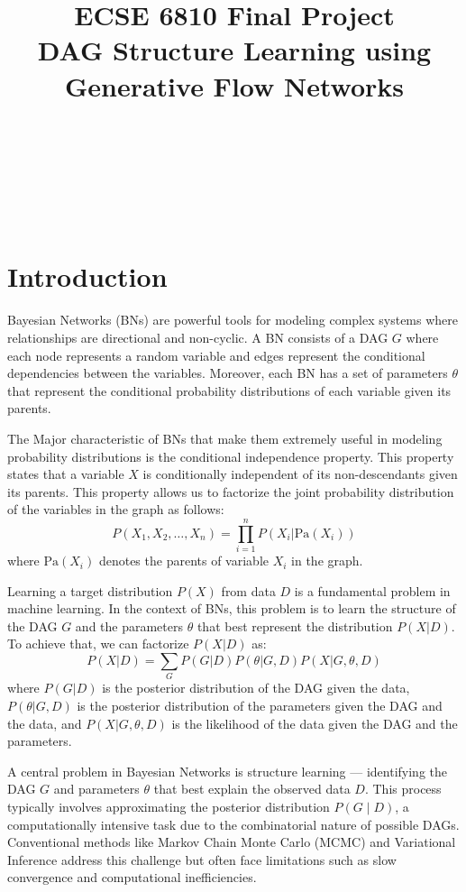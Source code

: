 \documentclass{lxaiproposal}
\title{ECSE 6810 Final Project \\ DAG Structure Learning using Generative Flow Networks}
\author{\coord{Ali}{Najibi}{}\\\\
\coord{\textbf{Course Instructor: Prof. Qiang}}{\textbf{Ji}}{}
}
\begin{document}
    \maketitle
    \\


    \section{Introduction}
    \vspace*{-3mm}

    Bayesian Networks (BNs) are powerful tools for modeling complex systems where relationships are directional and
    non-cyclic. A BN consists of a DAG $G$ where each node represents a random variable and edges
    represent the conditional dependencies between the variables. Moreover, each BN has a set of parameters $\theta$ that
    represent the conditional probability distributions of each variable given its parents.

    The Major characteristic of BNs that make them extremely useful in modeling probability distributions is the
    conditional independence property. This property states that a variable $X$ is conditionally independent of its
    non-descendants given its parents. This property allows us to factorize the joint probability distribution of the
    variables in the graph as follows:
    \begin{equation}
        P(X_1, X_2, \ldots, X_n) = \prod_{i=1}^{n} P(X_i | \text{Pa}(X_i))
        \label{eq:bn_factorization}
    \end{equation}
    where $\text{Pa}(X_i)$ denotes the parents of variable $X_i$ in the graph.

    Learning a target distribution $P(X)$ from data $D$ is a fundamental problem in machine learning. In the context of
    BNs, this problem is to learn the structure of the DAG $G$ and the parameters $\theta$ that best represent the
    distribution $P(X|D)$. To achieve that, we can factorize $P(X|D)$ as:
    \begin{equation}
        P(X|D) = \sum_{G} P(G|D) P(\theta|G,D) P(X|G,\theta,D)
        \label{eq:bn_learning}
    \end{equation}
    where $P(G|D)$ is the posterior distribution of the DAG given the data, $P(\theta|G,D)$ is the posterior distribution
    of the parameters given the DAG and the data, and $P(X|G,\theta,D)$ is the likelihood of the data given the DAG and
    the parameters.


    A central problem in Bayesian Networks is structure learning — identifying the DAG $G$ and parameters
    $\theta$ that best explain the observed data $D$. This process typically involves approximating the posterior
    distribution $P(G\mid D)$, a computationally intensive task due to the combinatorial nature of
    possible DAGs. Conventional methods like Markov Chain Monte Carlo (MCMC) and Variational Inference address this
    challenge but often face limitations such as slow convergence and computational inefficiencies.
\end{document}
